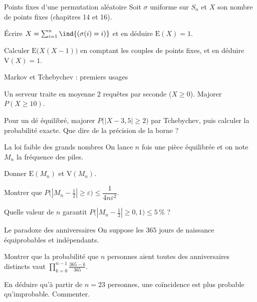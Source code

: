 \begin{exercice}[2]{Points fixes d'une permutation aléatoire}
Soit $\sigma$ uniforme sur $S_n$ et $X$ son nombre de points fixes
(chapitres 14 et 16).
\begin{questions}
  \item Écrire $X=\sum_{i=1}^{n}\ind{(\sigma(i)=i)}$ et en déduire
    $\mathrm{E}(X)=1$.
  \item Calculer $\mathrm{E}\bigl(X(X-1)\bigr)$ en comptant les couples de
    points fixes, et en déduire $\mathrm{V}(X)=1$.
\end{questions}
\end{exercice}

\begin{exercice}[2]{Markov et Tchebychev : premiers usages}
\begin{questions}
  \item Un serveur traite en moyenne $2$ requêtes par seconde
    ($X\geqslant0$). Majorer $P(X\geqslant10)$.
  \item Pour un dé équilibré, majorer
    $P\bigl(|X-3{,}5|\geqslant2\bigr)$ par Tchebychev, puis calculer la
    probabilité exacte. Que dire de la précision de la borne ?
\end{questions}
\end{exercice}

\begin{exercice}[2]{La loi faible des grands nombres}
On lance $n$ fois une pièce équilibrée et on note $M_n$ la fréquence des
piles.
\begin{questions}
  \item Donner $\mathrm{E}(M_n)$ et $\mathrm{V}(M_n)$.
  \item Montrer que
    $P\bigl(|M_n-\tfrac12|\geqslant\varepsilon\bigr)
    \leqslant\dfrac{1}{4n\varepsilon^{2}}$.
  \item Quelle valeur de $n$ garantit
    $P\bigl(|M_n-\tfrac12|\geqslant0{,}1\bigr)\leqslant5\,\%$ ?
\end{questions}
\end{exercice}

\begin{exercice}[2]{Le paradoxe des anniversaires}
On suppose les $365$ jours de naissance équiprobables et indépendants.
\begin{questions}
  \item Montrer que la probabilité que $n$ personnes aient toutes des
    anniversaires distincts vaut
    $\displaystyle\prod_{k=0}^{n-1}\frac{365-k}{365}$.
  \item En déduire qu'à partir de $n=23$ personnes, une coïncidence est
    plus probable qu'improbable. Commenter.
\end{questions}
\end{exercice}

